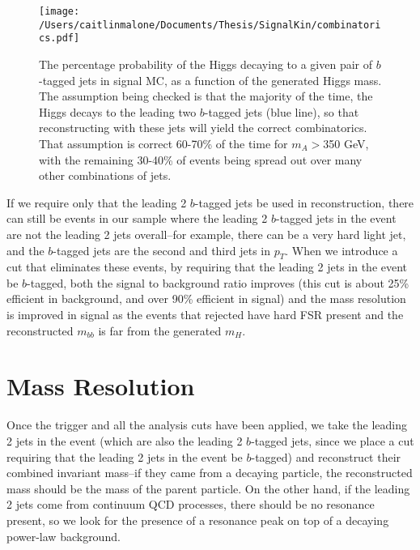 \begin{figure}[hbt]
  \texttt{[image: /Users/caitlinmalone/Documents/Thesis/SignalKin/combinatorics.pdf]}
  \label{fig:combinatorics}
  \caption{The percentage probability of the Higgs decaying to a given pair of $b$-tagged jets in signal MC,
    as a function of the generated Higgs mass.  The assumption being checked is that the majority of
    the time, the Higgs decays to the leading two $b$-tagged jets (blue line), so that reconstructing with these jets
    will yield the correct combinatorics.  That assumption is correct 60-70\% of the time for $m_A>$350 GeV,
    with the remaining 30-40\% of events being spread out over many other combinations of jets.}
\end{figure}
                                                                                                                                    
                                                                                                                                    
If we require only that the leading 2 $b$-tagged jets be used in reconstruction, there can                                          
still be events in our sample where the leading 2 $b$-tagged jets in the event are not                                              
the leading 2 jets overall--for example, there can be a very hard light jet, and the $b$-tagged                                     
jets are the second and third jets in $p_T$.  When we introduce a cut that eliminates these events,                                 
by requiring that the leading 2 jets in the event be $b$-tagged, both the signal to background                                      
ratio improves (this cut is about 25\% efficient in background, and over 90\% efficient                                             
in signal) and the mass resolution is improved in signal as the events that rejected have                                           
hard FSR present and the reconstructed $m_{bb}$ is far from the generated $m_H$.    




\section{Mass Resolution}
Once the trigger and all the analysis cuts have been applied, we take the leading 2 jets in the event (which are also the leading 2 $b$-tagged jets, since we place a cut requiring that the leading 2 jets in the event be $b$-tagged) and reconstruct their combined invariant mass--if they came from a decaying particle, the reconstructed mass should be the mass of the parent particle.  On the other hand, if the leading 2 jets come from continuum QCD processes, there should be no resonance present, so we look for the presence of a resonance peak on top of a decaying power-law background.



